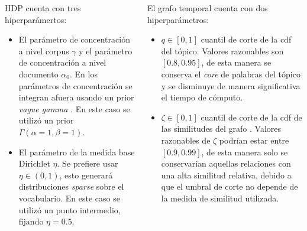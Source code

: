 \documentclass[
	spanish, %
	aspectratio=43, %
	hyperref={pdfencoding=auto,psdextra},
	xcolor={dvipsnames,table,usenames}
]{beamer}
\begin{document}
\begin{frame}


\begin{columns}
\begin{column}{0.5\textwidth}
HDP cuenta con tres hiperparámertos:
\begin{itemize} 
  \item El parámetro de concentración a nivel corpus $\gamma$ y el parámetro de concentración a nivel documento $\alpha_{0}$. En \cite{teh2005sharing} los parámetros de concentración se integran afuera usando un prior \textit{vague gamma} \cite{escobar1995bayesian}. En este caso se utilizó un prior $\Gamma(\alpha=1, \beta=1)$.
  \item El parámetro de la medida base Dirichlet $\eta$. Se prefiere usar $\eta\in (0,1)$, esto generará distribuciones \textit{sparse} sobre el vocabulario. En este caso se utilizó un punto intermedio, fijando $\eta=0.5$.\\ 
\end{itemize}
\end{column}

\begin{column}{0.5\textwidth}
El grafo temporal cuenta con dos hiperparámetros:
\begin{itemize}
  \item $q \in [0,1]$ cuantil de corte de la cdf del tópico. Valores razonables son $[0.8, 0.95]$, de esta manera se conserva el \textit{core} de palabras del tópico y se disminuye de manera significativa el tiempo de cómputo.
  \item $\zeta\in[0,1]$ cuantil de corte de la cdf de las similitudes del grafo . Valores razonables de $\zeta$ podrían estar entre $[0.9, 0.99]$, de esta manera solo se conservarían aquellas relaciones con una alta similitud relativa, debido a que el umbral de corte no depende de la medida de similitud utilizada.
\end{itemize}
\end{column}
\end{columns}
\end{frame}
\end{document}
